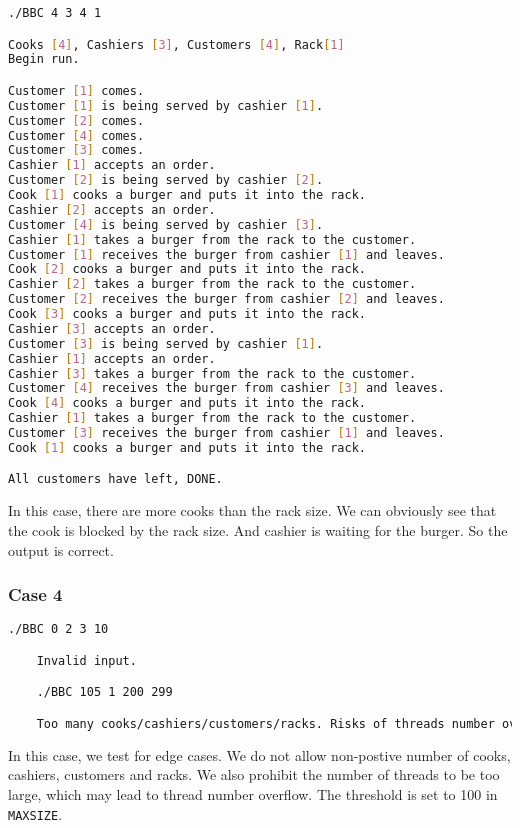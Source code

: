 \begin{lstlisting}[language=bash]
./BBC 4 3 4 1

Cooks [4], Cashiers [3], Customers [4], Rack[1]
Begin run.

Customer [1] comes.
Customer [1] is being served by cashier [1].
Customer [2] comes.
Customer [4] comes.
Customer [3] comes.
Cashier [1] accepts an order.
Customer [2] is being served by cashier [2].
Cook [1] cooks a burger and puts it into the rack.
Cashier [2] accepts an order.
Customer [4] is being served by cashier [3].
Cashier [1] takes a burger from the rack to the customer.
Customer [1] receives the burger from cashier [1] and leaves.
Cook [2] cooks a burger and puts it into the rack.
Cashier [2] takes a burger from the rack to the customer.
Customer [2] receives the burger from cashier [2] and leaves.
Cook [3] cooks a burger and puts it into the rack.
Cashier [3] accepts an order.
Customer [3] is being served by cashier [1].
Cashier [1] accepts an order.
Cashier [3] takes a burger from the rack to the customer.
Customer [4] receives the burger from cashier [3] and leaves.
Cook [4] cooks a burger and puts it into the rack.
Cashier [1] takes a burger from the rack to the customer.
Customer [3] receives the burger from cashier [1] and leaves.
Cook [1] cooks a burger and puts it into the rack.

All customers have left, DONE.
\end{lstlisting}

In this case, there are more cooks than the rack size. We can obviously see
that the cook is blocked by the rack size. And cashier is waiting for the burger.
So the output is correct.

\subsubsection{Case 4}
\begin{lstlisting}[language=bash]
    ./BBC 0 2 3 10

    Invalid input.

    ./BBC 105 1 200 299

    Too many cooks/cashiers/customers/racks. Risks of threads number overflow.

\end{lstlisting}

In this case, we test for edge cases. We do not allow non-postive number of cooks, cashiers, customers and racks.
We also prohibit the number of threads to be too large, which may lead to thread number overflow. The threshold is set to 100 in \texttt{MAXSIZE}.

